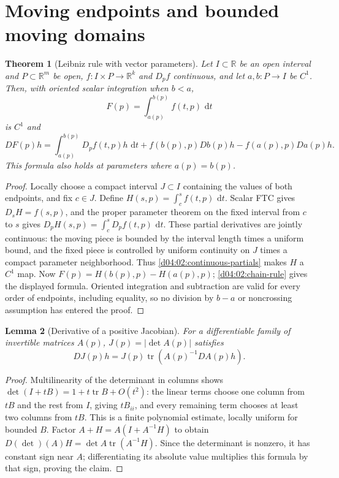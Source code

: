 \documentclass[11pt,oneside,openany]{book}
\newtheorem{theorem}{Theorem}[chapter]
\newtheorem{lemma}[theorem]{Lemma}
\theoremstyle{definition}
\theoremstyle{remark}
\newcommand{\R}{\mathbb R}
\newcommand{\dd}{\,\mathrm d}
\DeclareMathOperator{\tr}{tr}
\newcommand{\family}[1]{}
\begin{document}
\section{Moving endpoints and bounded moving domains}
\family{K04.08.05}
\begin{theorem}[Leibniz rule with vector parameters]\label{d04:08:endpoints}
Let $I\subset\R$ be an open interval and $P\subset\R^m$ be open, $f:I\times P\to\R^k$ and $D_pf$ continuous, and let $a,b:P\to I$ be $C^1$. Then, with oriented scalar integration when $b<a$,
\[
 F(p)=\int_{a(p)}^{b(p)}f(t,p)\,\dd t
\]
is $C^1$ and
\[
 DF(p)h=\int_{a(p)}^{b(p)}D_pf(t,p)h\,\dd t
 +f(b(p),p)Db(p)h-f(a(p),p)Da(p)h.
\]
This formula also holds at parameters where $a(p)=b(p)$.
\end{theorem}
\begin{proof}
Locally choose a compact interval $J\subset I$ containing the values of both endpoints, and fix $c\in J$. Define $H(s,p)=\int_c^s f(t,p)\,\dd t$. Scalar FTC gives $D_sH=f(s,p)$, and the proper parameter theorem on the fixed interval from $c$ to $s$ gives $D_pH(s,p)=\int_c^sD_pf(t,p)\,\dd t$. These partial derivatives are jointly continuous: the moving piece is bounded by the interval length times a uniform bound, and the fixed piece is controlled by uniform continuity on $J$ times a compact parameter neighborhood. Thus \cref{d04:02:continuous-partials} makes $H$ a $C^1$ map. Now $F(p)=H(b(p),p)-H(a(p),p)$; \cref{d04:02:chain-rule} gives the displayed formula. Oriented integration and subtraction are valid for every order of endpoints, including equality, so no division by $b-a$ or noncrossing assumption has entered the proof.
\end{proof}

\family{K04.08.06}
\begin{lemma}[Derivative of a positive Jacobian]\label{d04:08:jacobian-derivative}
For a differentiable family of invertible matrices $A(p)$, $J(p)=|\det A(p)|$ satisfies
\[
 DJ(p)h=J(p)\tr(A(p)^{-1}DA(p)h).
\]
\end{lemma}
\begin{proof}
Multilinearity of the determinant in columns shows
$\det(I+tB)=1+t\tr B+O(t^2)$: the linear terms choose one column from $tB$ and the rest from $I$, giving $tB_{ii}$, and every remaining term chooses at least two columns from $tB$. This is a finite polynomial estimate, locally uniform for bounded $B$. Factor
$A+H=A(I+A^{-1}H)$ to obtain
$D(\det)(A)H=\det A\tr(A^{-1}H)$. Since the determinant is nonzero, it has constant sign near $A$; differentiating its absolute value multiplies this formula by that sign, proving the claim.
\end{proof}
\end{document}
